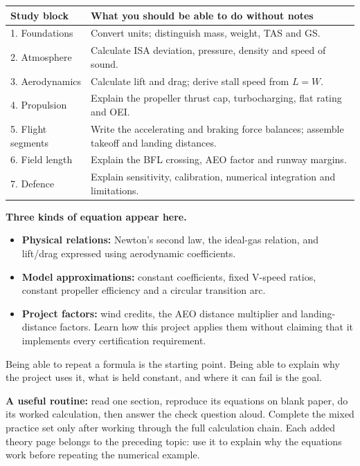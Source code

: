 \documentclass[11pt,letterpaper]{article}
\begin{document}
\par
\begin{tabularx}{\linewidth}{@{}lX@{}}\toprule
Study block & What you should be able to do without notes\\\midrule
1. Foundations & Convert units; distinguish mass, weight, TAS and GS.\\
2. Atmosphere & Calculate ISA deviation, pressure, density and speed of sound.\\
3. Aerodynamics & Calculate lift and drag; derive stall speed from $L=W$.\\
4. Propulsion & Explain the propeller thrust cap, turbocharging, flat rating and OEI.\\
5. Flight segments & Write the accelerating and braking force balances; assemble takeoff and landing distances.\\
6. Field length & Explain the BFL crossing, AEO factor and runway margins.\\
7. Defence & Explain sensitivity, calibration, numerical integration and limitations.\\\bottomrule
\end{tabularx}

\textbf{Three kinds of equation appear here.}
\begin{itemize}
\item \textbf{Physical relations:} Newton's second law, the ideal-gas relation,
and lift/drag expressed using aerodynamic coefficients.
\item \textbf{Model approximations:} constant coefficients, fixed V-speed ratios,
constant propeller efficiency and a circular transition arc.
\item \textbf{Project factors:} wind credits, the AEO distance multiplier and
landing-distance factors. Learn how this project applies them without claiming
that it implements every certification requirement.
\end{itemize}
\begin{keyidea}
Being able to repeat a formula is the starting point. Being able to explain
why the project uses it, what is held constant, and where it can fail is the goal.
\end{keyidea}
\textbf{A useful routine:} read one section, reproduce its equations on blank
paper, do its worked calculation, then answer the check question aloud. Complete
the mixed practice set only after working through the full calculation chain.
Each added theory page belongs to the preceding topic: use it to explain why
the equations work before repeating the numerical example.
\end{document}
